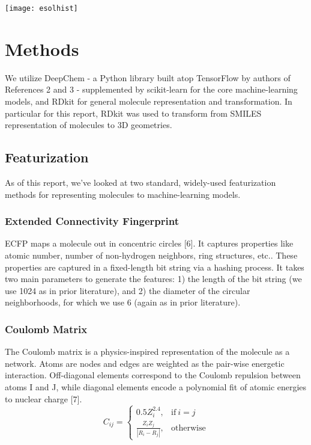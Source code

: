 \documentclass{article}
\begin{document}
\texttt{[image: esolhist]}

\section{Methods}

We utilize DeepChem - a Python library built atop TensorFlow by authors of References 2 and 3 - supplemented by scikit-learn for the core machine-learning models, and RDkit for general molecule representation and transformation. In particular for this report, RDkit was used to transform from SMILES representation of molecules to 3D geometries.

\subsection{Featurization}

As of this report, we've looked at two standard, widely-used featurization methods for representing molecules to machine-learning models.

\subsubsection{Extended Connectivity Fingerprint}

ECFP maps a molecule out in concentric circles [6]. It captures properties like atomic number, number of non-hydrogen neighbors, ring structures, etc.. These properties are captured in a fixed-length bit string via a hashing process. It takes two main parameters to generate the features: 1) the length of the bit string (we use 1024 as in prior literature), and 2) the diameter of the circular neighborhoods, for which we use 6 (again as in prior literature).

\subsubsection{Coulomb Matrix}

The Coulomb matrix is a physics-inspired representation of the molecule as a network. Atoms are nodes and edges are weighted as the pair-wise energetic interaction. Off-diagonal elements correspond to the Coulomb repulsion between atoms I and J, while diagonal elements encode a polynomial fit of atomic energies to nuclear charge [7].
  \begin{equation}
    C_{ij}=
    \begin{cases}
      0.5 Z_i^{2.4}, & \text{if}\ i=j \\
      \frac{Z_i Z_j}{|R_i - R_j|}, & \text{otherwise}
    \end{cases}
  \end{equation}
 
\end{document}
